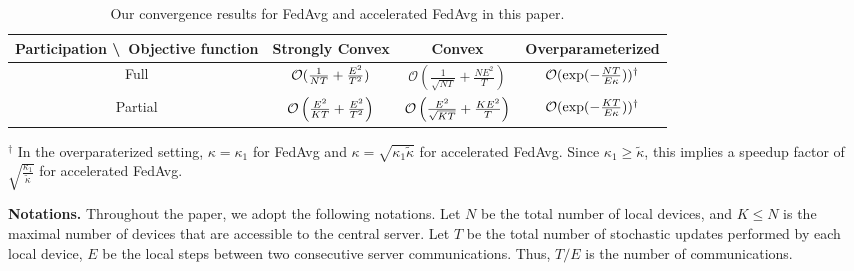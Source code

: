 \begin{table}[h!]
\centering
{\small
\begin{tabular}{|c|c|c|c|}\hline 
	Participation \textbackslash\ Objective function            & Strongly Convex        & Convex  & Overparameterized \\ \hline \hline
	Full                         & ${\mathcal{O}}(\frac{1}{NT}+\frac{E^{2}}{T^{2}})$    &  $\mathcal{O}\left(\frac{1}{\sqrt{NT}}+\frac{NE^{2}}{T}\right)$   & ${\mathcal{O}}(\exp(-\frac{NT}{E\kappa }))^{\dagger}$    \\ \hline
	Partial                      &  ${\mathcal{O}}\left(\frac{E^{2}}{KT}+\frac{E^{2}}{T^{2}}\right)$   &  ${\mathcal{O}}\left(\frac{E^2}{\sqrt{KT}}+\frac{KE^2}{T} \right)$ & ${\mathcal{O}}(\exp(-\frac{KT}{E\kappa }))^{\dagger}$     \\ \hline
\end{tabular}
}
\caption{Our convergence results for FedAvg and accelerated FedAvg in this paper.  }
{\raggedright 
         $^{\dagger}$ In the overparaterized setting, $\kappa=\kappa_1$ for FedAvg and $\kappa=\sqrt{\kappa_1\tilde{\kappa}}$ for accelerated FedAvg. Since
$\kappa_{1}\geq\tilde{\kappa}$, this implies a speedup factor of
$\sqrt{\frac{\kappa_{1}}{\tilde{\kappa}}}$ for accelerated FedAvg.\\
           \par}
\label{tb:convergencerateintro}
\end{table}



\textbf{Notations.}
Throughout the paper, we adopt the following notations. Let $N$ be the total
number of local devices, and $K \leq N$ is the maximal number of devices
that are accessible to the central server.  Let $T$ be the total number of stochastic updates performed by each local device, $E$ be the local steps between two consecutive server communications. Thus, $T/E$ is
the number of communications.

